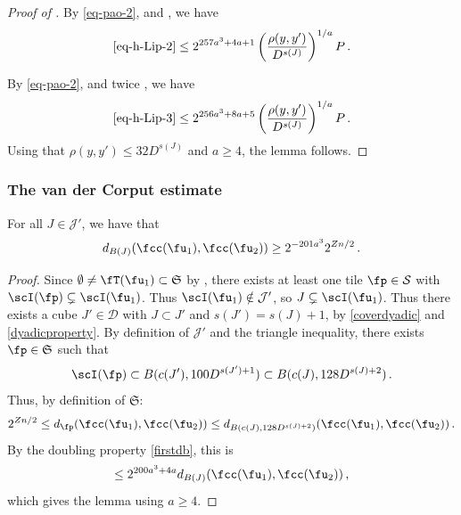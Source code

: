 \begin{proof}[Proof of ]
        By \eqref{eq-pao-2},  and , we have
        $$
            \eqref{eq-h-Lip-2} \le 2^{257a^3+4a+1} \left(\frac{\rho(y,y')}{D^{s(J)}}\right)^{1/a} P\,.
        $$

        By \eqref{eq-pao-2}, and twice , we have
        $$
            \eqref{eq-h-Lip-3} \le 2^{256a^3+8a+5} \left(\frac{\rho(y,y')}{D^{s(J)}}\right)^{1/a} P\,.
        $$
        Using that $\rho(y,y') \le 32D^{s(J)}$ and $a \ge 4$, the lemma follows.
    \end{proof}

\subsubsection{The van der Corput estimate}
\label{subsubsec-van-der-corput}
    \begin{lemma}
        \label{lower-oscillation-bound}
        \leanok
        For all $J \in \mathcal{J}'$, we have that
        $$
            d_{B(J)}(\fcc(\fu_1), \fcc(\fu_2)) \ge 2^{-201a^3} 2^{Zn/2}\,.
        $$
    \end{lemma}

    \begin{proof}
    \leanok
    Since $\emptyset \ne \fT(\fu_1) \subset \mathfrak{S}$ by , there exists at least one tile $\fp \in \mathcal{S}$ with $\scI(\fp) \subsetneq \scI(\fu_1)$. Thus $\scI(\fu_1) \notin \mathcal{J}'$, so $J \subsetneq \scI(\fu_1)$. Thus there exists a cube $J' \in \mathcal{D}$ with $J \subset J'$ and $s(J') = s(J) + 1$, by \eqref{coverdyadic} and \eqref{dyadicproperty}. By definition of $\mathcal{J'}$ and the triangle inequality, there exists $\fp \in \mathfrak{S}$ such that
    $$
        \scI(\fp) \subset B(c(J'), 100 D^{s(J') + 1}) \subset B(c(J), 128 D^{s(J)+2})\,.
    $$
    Thus, by definition of $\mathfrak{S}$:
    \begin{align*}
        2^{Zn/2} \le d_{\fp}(\fcc(\fu_1), \fcc(\fu_2)) \le d_{B(c(J), 128 D^{s(J)+2})}(\fcc(\fu_1), \fcc(\fu_2))\,.
    \end{align*}
    By the doubling property \eqref{firstdb}, this is
    $$
        \le 2^{200a^3 + 4a} d_{B(J)}(\fcc(\fu_1), \fcc(\fu_2))\,,
    $$
    which gives the lemma using $a \ge 4$.
    \end{proof}

